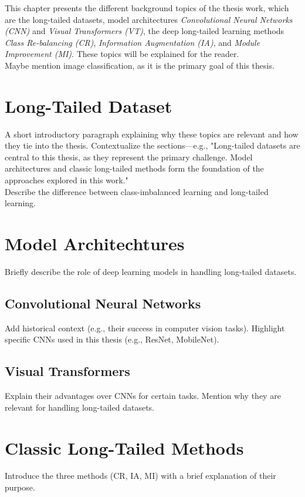 

This chapter presents the different background topics of the thesis work, which are the long-tailed datasets, model architectures \textit{Convolutional Neural Networks (CNN)} and \textit{Visual Transformers (VT)}, the deep long-tailed learning methods \textit{Class Re-balancing (CR)}, \textit{Information Augmentation (IA)}, 
and \textit{Module Improvement (MI)}. These topics will be explained for the reader.\\

Maybe mention image classification, as it is the primary goal of this thesis. 

\section{Long-Tailed Dataset}
A short introductory paragraph explaining why these topics are relevant and how they tie into the thesis.
Contextualize the sections—e.g., "Long-tailed datasets are central to this thesis, as they represent the primary challenge. Model architectures and classic long-tailed methods form the foundation of the approaches explored in this work."\\

Describe the difference between class-imbalanced learning and long-tailed learning.

\section{Model Architechtures}
Briefly describe the role of deep learning models in handling long-tailed datasets.

\subsection{Convolutional Neural Networks}
Add historical context (e.g., their success in computer vision tasks).
Highlight specific CNNs used in this thesis (e.g., ResNet, MobileNet).

\subsection{Visual Transformers}
Explain their advantages over CNNs for certain tasks.
Mention why they are relevant for handling long-tailed datasets.


\section{Classic Long-Tailed Methods}
Introduce the three methods (CR, IA, MI) with a brief explanation of their purpose.\\

